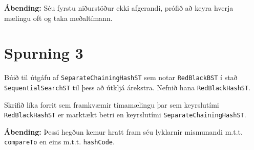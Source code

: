 \documentclass{article}
\begin{document}
\textbf{Ábending:} Séu fyrstu niðurstöður ekki afgerandi, prófið að keyra hverja mælingu oft og taka meðaltímann.

\section{Spurning 3}

Búið til útgáfu af \texttt{SeparateChainingHashST} sem notar \texttt{RedBlackBST} í stað \texttt{SequentialSearchST} til þess að útkljá árekstra. Nefnið hana \texttt{RedBlackHashST}.

Skrifið líka forrit sem framkvæmir tímamælingu þar sem keyrslutími \texttt{RedBlackHashST} er marktækt betri en keyrslutími \texttt{SeparateChainingHashST}.

\textbf{Ábending:} Þessi hegðun kemur hratt fram séu lyklarnir mismunandi m.t.t. \texttt{compareTo} en eins m.t.t. \texttt{hashCode}.

\end{document}
